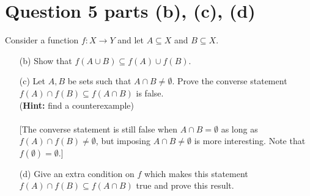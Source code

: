 \documentclass[13pt]{article}
\begin{document}
\section*{Question 5 parts (b), (c), (d)}
Consider a function $f : X \rightarrow Y$ and let $A \subseteq X$ and $B \subseteq X$.
\begin{enumerate}[label=(\alph*)]
\item [(b)] Show that $f(A \cup B) \subseteq f(A) \cup f(B)$.
\item [(c)] Let $A, B$ be sets such that $A \cap B \neq \emptyset$. Prove the converse statement $f(A) \cap f(B)
  \subseteq f(A \cap B)$ is false. \\
  (\textbf{Hint:} find a counterexample) \\ \\
  {[The converse statement is still false when $A \cap B = \emptyset$ as long as $f(A) \cap f(B) \neq \emptyset$,
  but imposing $A \cap B \neq \emptyset$ is more interesting. Note that $f(\emptyset) = \emptyset$.]}
\item [(d)] Give an extra condition on $f$ which makes this statement $f(A) \cap f(B) \subseteq f(A \cap B)$ true
  and prove this result.
\end{enumerate}
\end{document}
